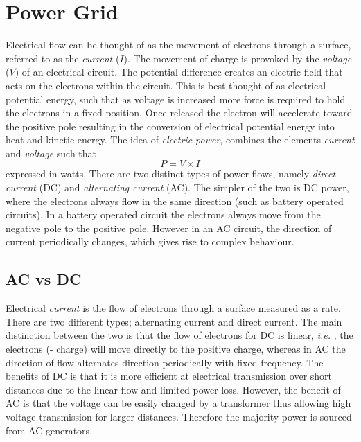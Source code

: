 \documentclass{article}
\newcommand{\ie}{\textit{i.e. }}
\begin{document}
\section{Power Grid}

Electrical flow can be thought of as the movement of electrons through a surface, referred to as the {\it current} ($I$). The movement of charge is provoked by the {\it voltage} ($V$) of an electrical circuit. The potential difference creates an electric field that acts on the electrons within the circuit. This is best thought of as electrical potential energy, such that as voltage is increased more force is required to hold the electrons in a fixed position. Once released the electron will accelerate toward the positive pole resulting in the conversion of electrical potential energy into heat and kinetic energy. The idea of {\it electric power}, combines the elements {\it current} and {\it voltage} such that 
\begin{equation}
P=V\times I
\end{equation}
expressed in watts. There are two distinct types of power flows, namely {\it direct current} (DC) and {\it alternating current} (AC). The simpler of the two is DC power, where the electrons always flow in the same direction (such as battery operated circuits). In a battery operated circuit the electrons always move from the negative pole to the positive pole. However in an AC circuit, the direction of current periodically changes, which gives rise to complex behaviour. 


\subsection{AC vs DC}

Electrical {\it current} is the flow of electrons through a surface measured as a rate. There are two different types; alternating current and direct current. The main distinction between the two is that the flow of electrons for DC is linear, \ie, the electrons (- charge) will move directly to the positive charge, whereas in AC the direction of flow alternates direction periodically with fixed frequency. The benefits of DC is that it is more efficient at electrical transmission over short distances due to the linear flow and limited power loss. However, the benefit of AC is that the voltage can be easily changed by a transformer thus allowing high voltage transmission for larger distances. Therefore the majority power is sourced from AC generators. 
\end{document}

